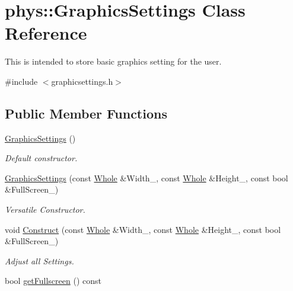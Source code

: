 \hypertarget{classphys_1_1GraphicsSettings}{
\section{phys::GraphicsSettings Class Reference}
\label{dc/df1/classphys_1_1GraphicsSettings}
}


This is intended to store basic graphics setting for the user.  




{\ttfamily \#include $<$graphicsettings.h$>$}

\subsection*{Public Member Functions}
\begin{DoxyCompactItemize}
\item 
\hyperlink{classphys_1_1GraphicsSettings_aceaaf53585413067adbf271e2c1e48fa}{GraphicsSettings} ()
\begin{DoxyCompactList}\small\item\em Default constructor. \item\end{DoxyCompactList}\item 
\hyperlink{classphys_1_1GraphicsSettings_a7cbb84f41101ef66a04e2a0990f796a2}{GraphicsSettings} (const \hyperlink{namespacephys_a460f6bc24c8dd347b05e0366ae34f34a}{Whole} \&Width\_\-, const \hyperlink{namespacephys_a460f6bc24c8dd347b05e0366ae34f34a}{Whole} \&Height\_\-, const bool \&FullScreen\_\-)
\begin{DoxyCompactList}\small\item\em Versatile Constructor. \item\end{DoxyCompactList}\item 
void \hyperlink{classphys_1_1GraphicsSettings_a63d41a500ee1ddf0ea9ffba5e353bae0}{Construct} (const \hyperlink{namespacephys_a460f6bc24c8dd347b05e0366ae34f34a}{Whole} \&Width\_\-, const \hyperlink{namespacephys_a460f6bc24c8dd347b05e0366ae34f34a}{Whole} \&Height\_\-, const bool \&FullScreen\_\-)
\begin{DoxyCompactList}\small\item\em Adjust all Settings. \item\end{DoxyCompactList}\item 
bool \hyperlink{classphys_1_1GraphicsSettings_a8871ea7d5c65c3b59d1d34b59531743f}{getFullscreen} () const 

\end{DoxyCompactItemize}

